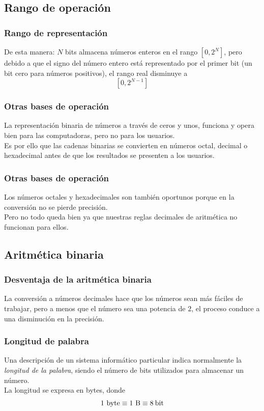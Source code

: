 \subsection{Rango de operación}
\begin{frame}
\frametitle{Rango de representación}
De esta manera: $N$ bits almacena números enteros en el rango $[0, 2^{N}]$, pero debido a que el signo del número entero está representado por el primer bit (un bit cero para números positivos), el rango real disminuye a 
\[ [0, 2^{N- 1}] \]
\end{frame}
\begin{frame}
\frametitle{Otras bases de operación}
La representación binaria de números a través de ceros y unos, funciona y opera bien para las computadoras, pero no para los usuarios.
\\
\bigskip
Es por ello que las cadenas binarias se convierten en números octal, decimal o hexadecimal antes de que los resultados se presenten a los usuarios.
\end{frame}
\begin{frame}
\frametitle{Otras bases de operación}
Los números octales y hexadecimales son también oportunos porque en la conversión no se pierde precisión.
\\
\bigskip
Pero no todo queda bien ya que nuestras reglas decimales de aritmética no funcionan para ellos.
\end{frame}
\subsection{Aritmética binaria}
\begin{frame}
\frametitle{Desventaja de la aritmética binaria}
La conversión a números decimales hace que los números sean más fáciles de trabajar, pero a menos que el número sea una potencia de $2$, el proceso conduce a una disminución en la precisión.
\end{frame}
\begin{frame}
\frametitle{Longitud de palabra}
Una descripción de un sistema informático particular indica normalmente la \emph{longitud de la palabra}, siendo el número de bits utilizados para almacenar un número.
\\
\bigskip
La longitud se expresa en bytes, donde
\[ 1 \mbox{ byte} \equiv 1 \mbox{ B} \equiv 8 \: \si{\bit} \]
\end{frame}
